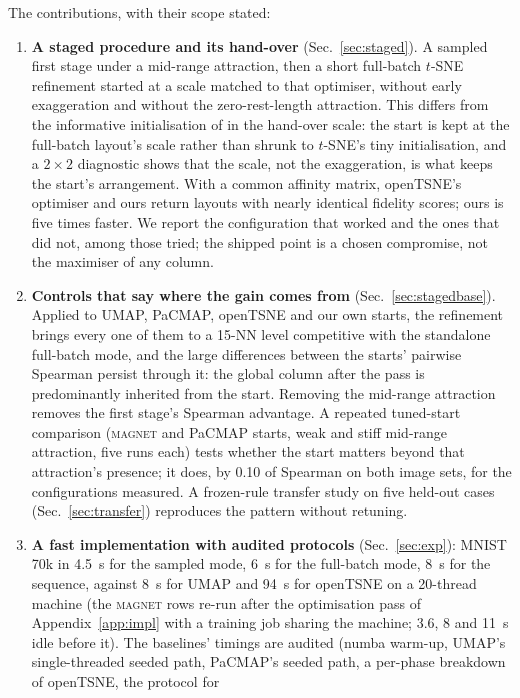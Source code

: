 \documentclass[11pt]{article}
\newcommand{\magnet}{\textsc{magnet}}
\begin{document}
The contributions, with their scope stated:
\begin{enumerate}[leftmargin=2em]
\item \textbf{A staged procedure and its hand-over} (Sec.~\ref{sec:staged}). A sampled first stage
  under a mid-range attraction, then a short full-batch $t$-SNE refinement started at a scale matched
  to that optimiser, without early exaggeration and without the zero-rest-length attraction. This
  differs from the informative initialisation of \citet{kobak2021init} in the hand-over scale: the
  start is kept at the full-batch layout's scale rather than shrunk to $t$-SNE's tiny initialisation,
  and a $2 \times 2$ diagnostic shows that the scale, not the exaggeration, is what keeps the start's
  arrangement. With a common affinity matrix, openTSNE's optimiser and ours return layouts with nearly
  identical fidelity scores; ours is five times faster. We report the configuration that worked and the ones that did
  not, among those tried; the shipped point is a chosen compromise, not the maximiser of any column.
\item \textbf{Controls that say where the gain comes from} (Sec.~\ref{sec:stagedbase}). Applied to
  UMAP, PaCMAP, openTSNE and our own starts, the refinement brings every one of them to a 15-NN level
  competitive with the standalone full-batch mode, and the large differences between the starts'
  pairwise Spearman persist through it: the global column after the pass is predominantly inherited
  from the start. Removing the mid-range attraction removes the first stage's Spearman advantage. A
  repeated tuned-start comparison (\magnet{} and PaCMAP starts, weak and stiff mid-range attraction,
  five runs each) tests whether the start matters beyond that attraction's presence; it does, by 0.10
  of Spearman on both image sets, for the configurations measured. A frozen-rule transfer study on
  five held-out cases (Sec.~\ref{sec:transfer}) reproduces the pattern without retuning.
\item \textbf{A fast implementation with audited protocols} (Sec.~\ref{sec:exp}): MNIST 70k in 4.5~s for
  the sampled mode, 6~s for the full-batch mode, 8~s for the sequence, against 8~s for UMAP and 94~s
  for openTSNE on a 20-thread machine (the \magnet{} rows re-run after the optimisation pass of
  Appendix~\ref{app:impl} with a training job sharing the machine; 3.6, 8 and 11~s idle before it). The baselines' timings are audited (numba warm-up, UMAP's
  single-threaded seeded path, PaCMAP's seeded path, a per-phase breakdown of openTSNE, the protocol for

\end{enumerate}
\end{document}
